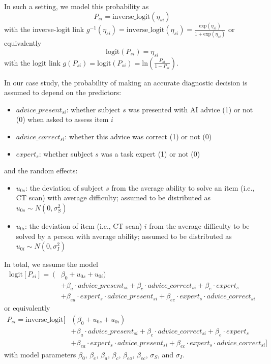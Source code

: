 \documentclass[
  man,
  floatsintext,
  longtable,
  a4paper,
  nolmodern,
  notxfonts,
  notimes,
  colorlinks=true,linkcolor=blue,citecolor=blue,urlcolor=blue]{apa7}
\providecommand{\tightlist}{%
  \setlength{\itemsep}{0pt}\setlength{\parskip}{0pt}}
\begin{document}
In such a setting, we model this probability as \[
P_{si} = \text{inverse\_logit}(\eta_{si})
\] with the inverse-logit link
\(g^{-1}(\eta_{si}) = \text{inverse\_logit}(\eta_{si}) = \frac{\text{exp}(\eta_{si})}{1 + \text{exp}(\eta_{si})}\)
or equivalently \[
\text{logit}(P_{si}) = \eta_{si}
\] with the logit link
\(g(P_{si}) = \text{logit}(P_{si}) = \text{ln} (\frac{P_{si}}{1 - P_{si}})\).

In our case study, the probability of making an accurate diagnostic
decision is assumed to depend on the predictors:

\begin{itemize}
\tightlist
\item
  \(advice\_present_{si}\): whether subject \(s\) was presented with AI
  advice (1) or not (0) when asked to assess item \(i\)
\item
  \(advice\_correct_{si}\): whether this advice was correct (1) or not
  (0)
\item
  \(expert_s\): whether subject \(s\) was a task expert (1) or not (0)
\end{itemize}

and the random effects:

\begin{itemize}
\tightlist
\item
  \(u_{0s}\): the deviation of subject \(s\) from the average ability to
  solve an item (i.e., CT scan) with average difficulty; assumed to be
  distributed as \(u_{0s} \sim N(0, \sigma_S^2)\)
\item
  \(u_{0i}\): the deviation of item (i.e., CT scan) \(i\) from the
  average difficulty to be solved by a person with average ability;
  assumed to be distributed as \(u_{0i} \sim N(0, \sigma_I^2)\)
\end{itemize}

In total, we assume the model \[
\begin{aligned}
\text{logit}[P_{si}] =\ (&\beta_0 + u_{0s} + u_{0i})\\
&+ \beta_a \cdot advice\_present_{si} + \beta_c \cdot advice\_correct_{si} + \beta_e \cdot expert_s\\
&+\beta_{ea} \cdot expert_{s} \cdot advice\_present_{si} + \beta_{ec} \cdot expert_{s} \cdot advice\_correct_{si}
\end{aligned}
\] or equivalently \[
\begin{aligned}
P_{si} = \text{inverse\_logit}[&(\beta_0 + u_{0s} + u_{0i})\\
&+ \beta_a \cdot advice\_present_{si} + \beta_c \cdot advice\_correct_{si} + \beta_e \cdot expert_s\\
&+ \beta_{ea} \cdot expert_{s} \cdot advice\_present_{si} + \beta_{ec} \cdot expert_{s} \cdot advice\_correct_{si}]
\end{aligned}
\] with model parameters \(\beta_0\), \(\beta_e\), \(\beta_a\),
\(\beta_c\), \(\beta_{ea}\), \(\beta_{ec}\), \(\sigma_S\), and
\(\sigma_I\).
\end{document}
